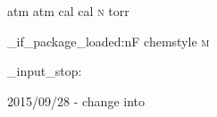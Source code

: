 %
%
%
%
%

\RequirePackage{siunitx}

\DeclareSIUnit {\atm       } {atm}
\DeclareSIUnit {\atmosphere} {atm}
\DeclareSIUnit {\calory    } {cal}
\DeclareSIUnit {\cal       } {cal}
\DeclareSIUnit {\moLar     } {\mole\per\liter}
\DeclareSIUnit {\MolMass   } {\gram\per\mole}
\DeclareSIUnit {\normal    } {\textsc{n}}
\DeclareSIUnit {\torr      } {torr}

\AtEndPreamble
  {
    \chemmacros_if_package_loaded:nF {chemstyle}
      {
        \DeclareSIUnit {\cmc  } {\cubic\centi\metre}
        \DeclareSIUnit {\molar} {\mole\per\cubic\deci\metre}
        \DeclareSIUnit {\Molar} {\textsc{m}}
      }
  }

\file_input_stop:

2015/09/28 - change \AtBeginDocument into \AtEndPreamble

